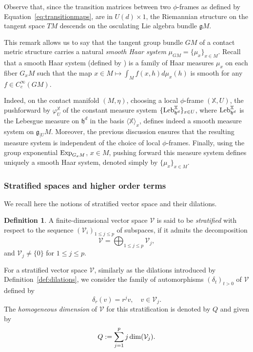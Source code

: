 \documentclass[12pt,a4paper]{amsart}
\theoremstyle{plain}
\theoremstyle{definition}
\newtheorem{definition}[theorem]{Definition}
\theoremstyle{remark}
\numberwithin{equation}{section}
\theoremstyle{definition}
\def \Exp{{\rm Exp}}
\def \cV{\mathcal{V}}
\def \bX{\mathbb{X}}
\def \fg{\mathfrak{g}}
\def \fh{\mathfrak{h}}
\numberwithin{equation}{section}
\begin{document}
Observe that, since the transition matrices between two $\phi$-frames as defined by Equation~\eqref{eq:transitionmaps}, are in $U(d)\times 1$, the Riemannian structure on the tangent space $TM$ descends on the osculating Lie algebra bundle $\fg M$.

This remark allows us to say that the tangent group bundle $GM$ of a contact metric structure carries a natural \emph{smooth Haar system} $\mu_{GM} = \{\mu_x\}_{x\in M}$. Recall that a smooth Haar system (defined by \cite[Definition 5.2]{FFF24}) is a family of Haar measures $\mu_x$  on each fiber $G_x M$ such that the map $x\in M \mapsto \int_{M} f(x,h)d\mu_x(h)$ is smooth for any $f\in C_{c}^\infty(GM)$. 

\vspace{0.25cm}

Indeed, on the contact manifold $(M,\eta)$, choosing a local $\phi$-frame $(\bX,U)$, the pushforward by $\varphi_{U}^\bX$ of the constant measure system $\{{\rm Leb}_{\fh^d}^{\bX}\}_{x\in U}$, where ${\rm Leb}_{\fh^d}^{\bX}$ is the Lebesgue measure on $\fh^d$ in the basis $\langle\bX\rangle_x$, defines indeed a smooth measure system on $\fg_{|U}M$. Moreover, the previous discussion ensures that the resulting measure system is independent of the choice of local $\phi$-frames. Finally, using the group exponential $\Exp_{G_x M}$, $x\in M$, pushing forward this measure system defines uniquely a smooth Haar system, denoted simply by $\{\mu_x\}_{x\in M}$.

\subsubsection{Stratified spaces and higher order terms}

We recall here the notions of stratified vector space and their dilations.

\begin{definition}
    \label{def:stratspace}
    A finite-dimensional vector space $\cV$ is said to be \emph{stratified} with respect to the sequence $(\cV_{i})_{1\leq j\leq p}$ of subspaces, if it admits the decomposition
    \begin{equation*}
        \cV = \bigoplus_{1\leq j\leq p} \cV_j,
    \end{equation*}
    and $\cV_j \neq \{0\}$ for $1\leq j \leq p$.
\end{definition}

For a stratified vector space $\cV$, similarly as the dilations introduced by Definition~\ref{def:dilations}, we consider the family of automorphisms $(\delta_t)_{t>0}$ of $\cV$ defined by 
\begin{equation*}
    \delta_r(v) = r^j v,\quad v\in\cV_j.
\end{equation*}
The \emph{homogeneous dimension} of $\cV$ for this stratification is denoted by $Q$ and given by
\begin{equation*}
    Q := \sum_{j=1}^p j\, {\rm dim}(\cV_j). 
\end{equation*}
\end{document}

